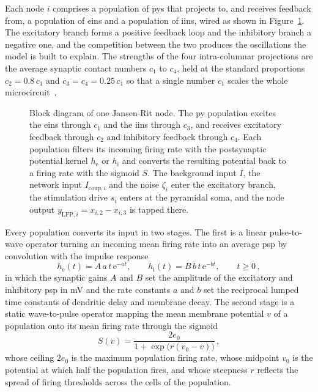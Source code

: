 Each node $i$ comprises a population of \acp{py} that projects to, and receives
feedback from, a population of \acp{ein} and a population of \acp{iin}, wired as shown in
Figure~\ref{fig:microcircuit}.
The excitatory branch forms a positive feedback loop and the inhibitory
branch a negative one, and the competition between the two produces the oscillations the
model is built to explain. The strengths of the four intra-columnar projections are the
average synaptic contact numbers $c_1$ to $c_4$, held at the standard proportions
$c_2 = 0.8\,c_1$ and $c_3 = c_4 = 0.25\,c_1$ so that a single number $c_1$ scales the
whole microcircuit~\cite{Jansen1995}. %

\begin{figure}
    \centering
    \caption{Block diagram of one Jansen-Rit node. The \ac{py} population excites the
    \acp{ein} through $c_1$ and the \acp{iin} through
    $c_3$, and receives excitatory feedback through $c_2$ and inhibitory feedback through
    $c_4$. Each population filters its incoming firing rate with the postsynaptic potential
    kernel $h_\mathrm{e}$ or $h_\mathrm{i}$ and converts the resulting potential back to a
    firing rate with the sigmoid $S$. The background input $I$, the network input
    $I_{\mathrm{coup},i}$ and the noise $\zeta_i$ enter the excitatory branch, the
    stimulation drive $s_i$ enters at the pyramidal soma, and the node output
    $y_{\mathrm{LFP},i} = x_{i,2} - x_{i,3}$ is tapped there.}
    \label{fig:microcircuit}
\end{figure}

Every population converts its input in two stages. The first is a linear pulse-to-wave
operator turning an incoming mean firing rate into an average \ac{psp} by convolution
with the impulse response
%
\begin{equation}
    h_\mathrm{e}(t) = A\,a\,t\,\mathrm{e}^{-a t}, \qquad
    h_\mathrm{i}(t) = B\,b\,t\,\mathrm{e}^{-b t}, \qquad t \geq 0 \,,
    \label{eq:psp_kernel}
\end{equation}
%
in which the synaptic gains $A$ and $B$ set the amplitude of the excitatory and inhibitory
\ac{psp} in \si{\milli\volt} and the rate constants $a$ and $b$ set the reciprocal
lumped time constants of dendritic delay and membrane decay. The second stage is a static
wave-to-pulse operator mapping the mean membrane potential $v$ of a population onto its
mean firing rate through the sigmoid
%
\begin{equation}
    S(v) = \frac{2 e_0}{1 + \exp\!\big(r (v_0 - v)\big)} \,,
    \label{eq:sigmoid}
\end{equation}
%
whose ceiling $2 e_0$ is the maximum population firing rate, whose midpoint $v_0$ is the
potential at which half the population fires, and whose steepness $r$ reflects the spread of
firing thresholds across the cells of the population.

